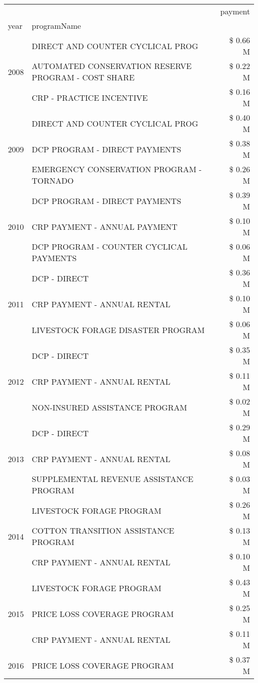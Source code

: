 \begin{tabular}{llr}
\toprule
 &  & payment \\
year & programName &  \\
\midrule
\multirow[t]{3}{*}{2008} & DIRECT AND COUNTER CYCLICAL PROG & \$ 0.66 M \\
 & AUTOMATED CONSERVATION RESERVE PROGRAM - COST SHARE & \$ 0.22 M \\
 & CRP - PRACTICE INCENTIVE & \$ 0.16 M \\
\cline{1-3}
\multirow[t]{3}{*}{2009} & DIRECT AND COUNTER CYCLICAL PROG & \$ 0.40 M \\
 & DCP PROGRAM - DIRECT PAYMENTS & \$ 0.38 M \\
 & EMERGENCY CONSERVATION PROGRAM - TORNADO & \$ 0.26 M \\
\cline{1-3}
\multirow[t]{3}{*}{2010} & DCP PROGRAM - DIRECT PAYMENTS & \$ 0.39 M \\
 & CRP PAYMENT - ANNUAL PAYMENT & \$ 0.10 M \\
 & DCP PROGRAM - COUNTER CYCLICAL PAYMENTS & \$ 0.06 M \\
\cline{1-3}
\multirow[t]{3}{*}{2011} & DCP - DIRECT & \$ 0.36 M \\
 & CRP PAYMENT - ANNUAL RENTAL & \$ 0.10 M \\
 & LIVESTOCK FORAGE DISASTER PROGRAM & \$ 0.06 M \\
\cline{1-3}
\multirow[t]{3}{*}{2012} & DCP - DIRECT & \$ 0.35 M \\
 & CRP PAYMENT - ANNUAL RENTAL & \$ 0.11 M \\
 & NON-INSURED ASSISTANCE PROGRAM & \$ 0.02 M \\
\cline{1-3}
\multirow[t]{3}{*}{2013} & DCP - DIRECT & \$ 0.29 M \\
 & CRP PAYMENT - ANNUAL RENTAL & \$ 0.08 M \\
 & SUPPLEMENTAL REVENUE ASSISTANCE PROGRAM & \$ 0.03 M \\
\cline{1-3}
\multirow[t]{3}{*}{2014} & LIVESTOCK FORAGE PROGRAM & \$ 0.26 M \\
 & COTTON TRANSITION ASSISTANCE PROGRAM & \$ 0.13 M \\
 & CRP PAYMENT - ANNUAL RENTAL & \$ 0.10 M \\
\cline{1-3}
\multirow[t]{3}{*}{2015} & LIVESTOCK FORAGE PROGRAM & \$ 0.43 M \\
 & PRICE LOSS COVERAGE PROGRAM & \$ 0.25 M \\
 & CRP PAYMENT - ANNUAL RENTAL & \$ 0.11 M \\
\cline{1-3}
\multirow[t]{3}{*}{2016} & PRICE LOSS COVERAGE PROGRAM                   & \$ 0.37 M \\

\end{tabular}
